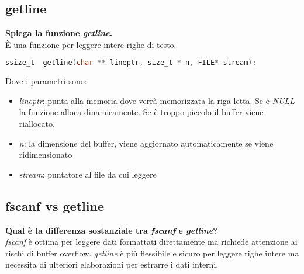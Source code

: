 \subsection{getline}
\textbf{Spiega la funzione \textit{getline}.}\\
È una funzione per leggere intere righe di testo.
\begin{lstlisting}[language=C]
	ssize_t	 getline(char ** lineptr, size_t * n, FILE* stream);
\end{lstlisting}
Dove i parametri sono:
\begin{itemize}
	\item \textit{lineptr}: punta alla memoria dove verrà memorizzata la riga letta. Se è \textit{NULL} la funzione alloca dinamicamente. Se è troppo piccolo il buffer viene riallocato.
	\item \textit{n}: la dimensione del buffer, viene aggiornato automaticamente se viene ridimensionato
	\item \textit{stream}: puntatore al file da cui leggere
\end{itemize}
\subsection{fscanf vs getline}
\textbf{Qual è la differenza sostanziale tra \textit{fscanf} e \textit{getline}?}\\
\textit{fscanf} è ottima per leggere dati formattati direttamente ma richiede attenzione ai rischi di buffer overflow. \textit{getline} è più flessibile e sicuro per leggere righe intere ma necessita di ulteriori elaborazioni per estrarre i dati interni.
